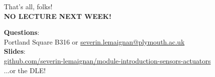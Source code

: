 \documentclass[compress]{beamer}
\makeatletter
\def\beamer@writeslidentry@miniframesoff{%
  \expandafter\beamer@ifempty\expandafter{\beamer@framestartpage}{}%
  {%
    \clearpage\beamer@notesactions%
  }
}
\newcommand*{\miniframesoff}{\let\beamer@writeslidentry=\beamer@writeslidentry@miniframesoff}
\makeatother
\begin{document}
\miniframesoff
\begin{frame}{}
    \begin{center}
        \Large
        That's all, folks!\\[2em]

        \textbf{NO LECTURE NEXT WEEK!}

        \normalsize
        \textbf{Questions}:\\
        Portland Square B316 or \url{severin.lemaignan@plymouth.ac.uk} \\[1em]

        \textbf{Slides}:\\
        \href{https://github.com/severin-lemaignan/module-introduction-sensors-actuators}{\small
        github.com/severin-lemaignan/module-introduction-sensors-actuators} \\

        ...or the DLE!


    \end{center}
\end{frame}
\end{document}
